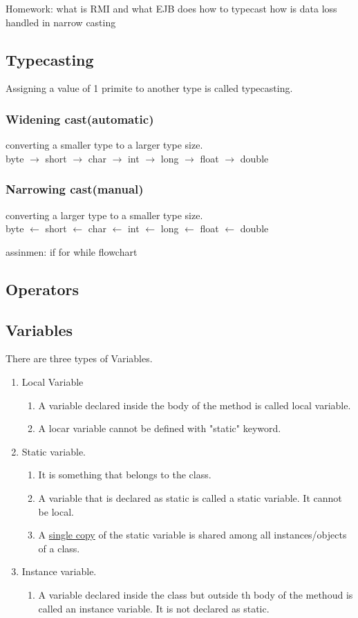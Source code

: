 \documentclass[11pt,letterpaper]{article}
\begin{document}
Homework: what is RMI and what EJB does
how to typecast
how is data loss handled in narrow casting

\subsection{Typecasting}
Assigning a value of 1 primite to another type is called typecasting. \\

\subsubsection{Widening cast(automatic)}
converting a smaller type to a larger type size.\\
byte $\rightarrow$ short $\rightarrow$ char $\rightarrow$ int $\rightarrow$ long $\rightarrow$ float $\rightarrow$ double 

\subsubsection{Narrowing cast(manual)}
converting a larger type to a smaller type size.\\
byte $\leftarrow$ short $\leftarrow$ char $\leftarrow$ int $\leftarrow$ long $\leftarrow$ float $\leftarrow$ double 

assinmen: if for while flowchart
\subsection{Operators}
\subsection{Variables}
There are three types of Variables. 
\begin{enumerate}
  \item Local Variable\\ 
    \begin{enumerate}
      \item A variable declared inside the body of the method is called local variable.
      \item A locar variable cannot be defined with "static" keyword. 
    \end{enumerate}
  \item Static variable.
    \begin{enumerate}
      \item It is something that belongs to the class.
      \item A variable that is declared as static is called a static variable. It cannot be local.
      \item A \underline{single copy} of the static variable is shared among all instances/objects of a class.
    \end{enumerate}
  \item Instance variable. 
    \begin{enumerate}
      \item A variable declared inside the class but outside th body of the methoud is called an instance variable. It is not declared as static.
    \end{enumerate}
\end{enumerate}
\end{document}
